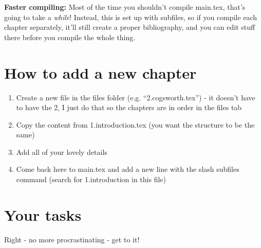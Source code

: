 \documentclass[../Main.tex]{subfiles}
\begin{document}
\textbf{Faster compiling:} Most of the time you shouldn't compile main.tex, that's going to take a \textit{while}! Instead, this is set up with subfiles, so if you compile each chapter separately, it'll still create a proper bibliography, and you can edit stuff there before you compile the whole thing.

\section{How to add a new chapter}
\begin{enumerate}
    \item Create a new file in the files folder (e.g. ``2.cogsworth.tex'') - it doesn't have to have the 2, I just do that so the chapters are in order in the files tab
    \item Copy the content from 1.introduction.tex (you want the structure to be the same)
    \item Add all of your lovely details
    \item Come back here to main.tex and add a new line with the slash subfiles command (search for 1.introduction in this file)
\end{enumerate}

\section{Your tasks}

Right - no more procrastinating - get to it!


\ifSubfilesClassLoaded{%
  
}{}
\end{document}
